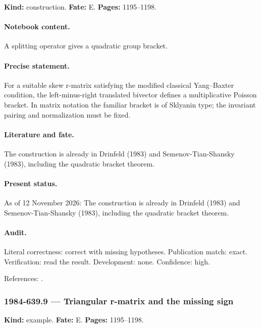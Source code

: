 \noindent\textbf{Kind:} construction. \textbf{Fate:} E. \textbf{Pages:} 1195--1198.\par

\paragraph{Notebook content.} A splitting operator gives a quadratic group bracket.

\paragraph{Precise statement.} For a suitable skew r-matrix satisfying the modified classical Yang--Baxter condition, the left-minus-right translated bivector defines a multiplicative Poisson bracket. In matrix notation the familiar bracket is of Sklyanin type; the invariant pairing and normalization must be fixed.

\paragraph{Literature and fate.} The construction is already in Drinfeld (1983) and Semenov-Tian-Shansky (1983), including the quadratic bracket theorem.

\paragraph{Present status.} As of 12 November 2026: The construction is already in Drinfeld (1983) and Semenov-Tian-Shansky (1983), including the quadratic bracket theorem.

\paragraph{Audit.} Literal correctness: correct with missing hypotheses. Publication match: exact. Verification: read the result. Development: none. Confidence: high.

\noindent References: \citep{drinfeld1983hamiltonian,semenov1983classical}.\par

\subsubsection{1984-639.9 --- Triangular r-matrix and the missing sign}

\label{item:1984-639.9}

\noindent\textbf{Kind:} example. \textbf{Fate:} E. \textbf{Pages:} 1195--1198.\par

